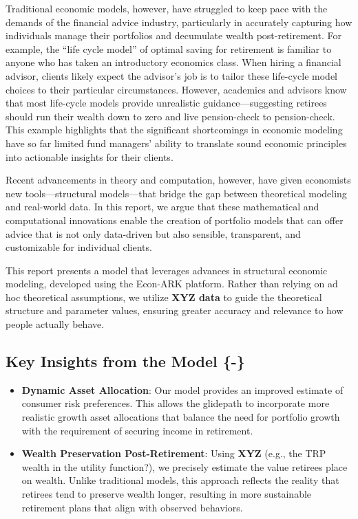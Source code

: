\documentclass{article}
\begin{document}
Traditional economic models, however, have struggled to keep pace with the demands of the financial advice industry, particularly in accurately capturing how individuals manage their portfolios and decumulate wealth post-retirement. For example, the ``life cycle model'' of optimal saving for retirement is familiar to anyone who has taken an introductory economics class. When hiring a financial advisor, clients likely expect the advisor's job is to tailor these life-cycle model choices to their particular circumstances. However, academics and advisors know that most life-cycle models provide unrealistic guidance---suggesting retirees should run their wealth down to zero and live pension-check to pension-check. This example highlights that the significant shortcomings in economic modeling have so far limited fund managers' ability to translate sound economic principles into actionable insights for their clients.

Recent advancements in theory and computation, however, have given economists new tools---structural models---that bridge the gap between theoretical modeling and real-world data. In this report, we argue that these mathematical and computational innovations enable the creation of portfolio models that can offer advice that is not only data-driven but also sensible, transparent, and customizable for individual clients.

This report presents a model that leverages advances in structural economic modeling, developed using the Econ-ARK platform. Rather than relying on ad hoc theoretical assumptions, we utilize \textbf{XYZ data} to guide the theoretical structure and parameter values, ensuring greater accuracy and relevance to how people actually behave.

\subsection{Key Insights from the Model \{-\}}

\begin{itemize}
\item \textbf{Dynamic Asset Allocation}: Our model provides an improved estimate of consumer risk preferences. This allows the glidepath to incorporate more realistic growth asset allocations that balance the need for portfolio growth with the requirement of securing income in retirement.
\item \textbf{Wealth Preservation Post-Retirement}: Using \textbf{XYZ} (e.g., the TRP wealth in the utility function?), we precisely estimate the value retirees place on wealth. Unlike traditional models, this approach reflects the reality that retirees tend to preserve wealth longer, resulting in more sustainable retirement plans that align with observed behaviors.
\end{itemize}
\end{document}
